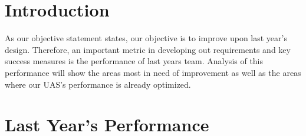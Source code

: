 \documentclass[]{auvsi_doc}
\begin{document}
\CapstoneTitlePage

\section{Introduction}
As our objective statement states, our objective is to improve upon last year's design. Therefore, an important metric in developing out requirements and key success measures is the performance of last years team. Analysis of this performance will show the areas most in need of improvement as well as the areas where our UAS's performance is already optimized. 

\section{Last Year's Performance}
\end{document}
